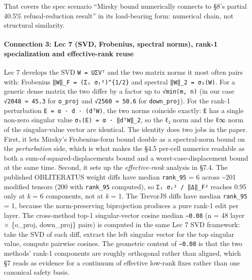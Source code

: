 \documentclass[
  11pt,
]{article}
\begin{document}
That covers the spec scenario ``Mirsky bound numerically connects to
§8's partial 40.5\% refusal-reduction result'' in its load-bearing form:
numerical chain, not structural similarity.

\paragraph{Connection 3: Lec 7 (SVD, Frobenius, spectral norms), rank-1
specialization and effective-rank
reuse}\label{connection-3-lec-7-svd-frobenius-spectral-norms-rank-1-specialization-and-effective-rank-reuse}

Lec 7 develops the SVD \texttt{W\ =\ UΣVᵀ} and the two matrix norms it
most often pairs with: Frobenius
\texttt{‖W‖\_F\ =\ (Σᵢ\ σᵢ²)\^{}\{1/2\}} and spectral
\texttt{‖W‖\_2\ =\ σ₁(W)}. For a generic dense matrix the two differ by
a factor up to \texttt{√min(m,\ n)} (in our case \texttt{√2048\ ≈\ 45.3}
for \texttt{o\_proj} and \texttt{√2560\ ≈\ 50.6} for
\texttt{down\_proj}). For the rank-1 perturbation
\texttt{E\ =\ α\ ·\ d\ ·\ (dᵀW)}, the two norms coincide exactly:
\texttt{E} has a single non-zero singular value
\texttt{σ₁(E)\ =\ \textbar{}α\textbar{}\ ·\ ‖dᵀW‖\_2}, so the ℓ₂ norm
and the ℓ∞ norm of the singular-value vector are identical. The identity
does two jobs in the paper. First, it lets Mirsky's Frobenius-form bound
double as a spectral-norm bound on the \emph{perturbation} side, which
is what makes the §4.5 per-cell numerics readable as both a
sum-of-squared-displacements bound and a worst-case-displacement bound
at the same time. Second, it sets up the \emph{effective-rank} analysis
in §7.4. The published OBLITERATUS weight diffs have median
\texttt{rank\_95} = 6 across \textasciitilde201 modified tensors (200
with \texttt{rank\_95} computed), so \texttt{Σᵢ\ σᵢ²\ /\ ‖Δ‖\_F²}
reaches 0.95 only at \emph{k} = 6 components, not at \emph{k} = 1. The
TrevorJS diffs have median \texttt{rank\_95} = 1, because the
norm-preserving biprojection produces a pure rank-1 edit per layer. The
cross-method top-1 singular-vector cosine median \texttt{−0.08} (n = 48
layer × \{o\_proj, down\_proj\} pairs) is computed in the same Lec 7 SVD
framework: take the SVD of each diff, extract the left singular vector
for the top singular value, compute pairwise cosines. The geometric
content of \texttt{−0.08} is that the two methods' rank-1 components are
roughly orthogonal rather than aligned, which §7 reads as evidence for a
continuum of effective low-rank fixes rather than one canonical safety
basis.
\end{document}
